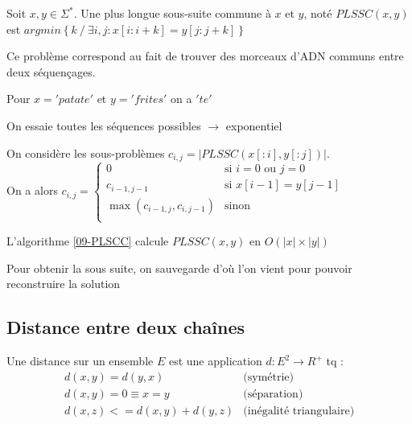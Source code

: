 \begin{definition}
	Soit $x, y \in \Sigma^*$. Une plus longue sous-suite commune à $x$ et $y$, noté $PLSSC(x,y)$ est $argmin \left\{k \: \big/ \: \exists i,j : x[i:i+k] = y[j:j+k]\right\}$
\end{definition}

\begin{appl}
	Ce problème correspond au fait de trouver des morceaux d'ADN communs entre deux séquençages.
\end{appl}

\begin{example}
	Pour $x = 'patate'$ et $y = 'frites'$ on a $'te'$
\end{example}

\begin{algo}
	On essaie toutes les séquences possibles $\to$ exponentiel
\end{algo}

\begin{algo}
	\label{09-PLSCC}
	On considère les sous-problèmes  $c_{i,j} = \left| PLSSC(x[:i], y[:j]) \right|$.\\
	On a alors $c_{i,j} = \left\{
	\begin{array}{ll}
		0 & \text{si } i = 0 \text{ ou } j = 0 \\
		c_{i-1, j-1} & \text{si } x[i-1] = y[j-1]\\
		\max(c_{i-1, j}, c_{i, j-1}) & \text{sinon} \\
	\end{array}\right.$
\end{algo}

\begin{proposition}
	L'algorithme \ref{09-PLSCC} calcule $PLSSC(x, y)$ en $O(|x| \times |y|) $
\end{proposition}

\begin{rem}
	Pour obtenir la sous suite, on sauvegarde d'où l'on vient pour pouvoir reconstruire la solution
\end{rem}

\subsection{Distance entre deux chaînes}

\begin{definition}[distance]
	Une distance sur un ensemble $E$ est une application $d : E^2 \to R^+$ tq :
	$$\begin{array}{ll}
		d(x,y) = d(y,x) & \text{(symétrie)}\\
		d(x,y) = 0 \equiv x = y & \text{(séparation)}\\
		d(x, z) <= d(x,y) + d(y, z) & \text{(inégalité triangulaire)}
	\end{array}
	$$
\end{definition}

